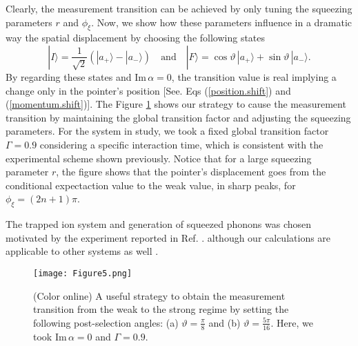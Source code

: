 \documentclass[aps,pra,preprint,superscriptaddress, showpacs]{revtex4-2}
\begin{document}
 Clearly, the measurement transition can be achieved by only tuning the squeezing parameters $r$ and $\phi_{\xi}$. Now, we show how these parameters influence in a dramatic way the spatial displacement by choosing the following states
\begin{equation}
|I\rangle=\frac{1}{\sqrt{2}}\left(|a_{+}\rangle-|a_{-}\rangle\right) \quad \text{and} \quad |F\rangle=\cos\vartheta\,|a_{+}\rangle+\sin\vartheta\,|a_{-}\rangle.
\end{equation}
By regarding these states and $\textrm{Im}\,\alpha=0$, the transition value is real implying a change only in the pointer's position [See. Eqs (\ref{position.shift}) and (\ref{momentum.shift})]. The Figure \ref{fig5} shows our strategy to cause the measurement transition by maintaining the global transition factor and adjusting the squeezing parameters. For the system in study, we took a fixed global transition factor $\Gamma=0.9$ considering a specific interaction time, which is consistent with the experimental scheme shown previously. Notice that for a large squeezing parameter $r$, the figure shows that the pointer's displacement goes from the conditional expectaction value to the weak value, in sharp peaks, for $\phi_{\xi}=(2n+1)\pi$. 

The trapped ion system and generation of squeezed phonons was chosen motivated by the experiment reported in Ref. \cite{pan2020weak,kienzler2015quantum, drechsler2020state}. although our calculations are applicable to other systems as well \cite{meekhof1996generation, burd2019quantum}.







\begin{figure}[h!]
	\centering
	\texttt{[image: Figure5.png]}
	\caption{(Color online) A useful strategy to obtain the measurement transition from the weak to the strong regime by setting the following post-selection angles: (a) $\vartheta=\frac{\pi}{8}$ and (b)  $\vartheta=\frac{5\pi}{16}$. Here, we took $\textrm{Im}\,\alpha=0$ and $\Gamma=0.9$.}
	\label{fig5}
\end{figure}
\end{document}
